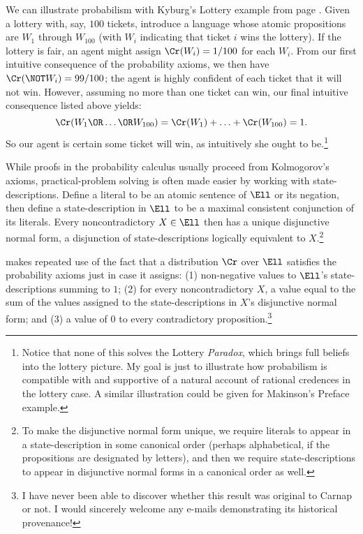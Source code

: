 We can illustrate probabilism with Kyburg's Lottery example from page \pageref{titelbaum-lottery}. Given a lottery with, say, $100$ tickets, introduce a language whose atomic propositions are $W_1$ through $W_{100}$ (with $W_i$ indicating that ticket $i$ wins the lottery). If the lottery is fair, an agent might assign $\Cr(W_i)=1/100$ for each $W_i$. From our first intuitive consequence of the probability axioms, we then have $\Cr(\NOT W_i)=99/100$; the agent is highly confident of each ticket that it will not win. However, assuming no more than one ticket can win, our final intuitive consequence listed above yields: 
\begin{equation}
\Cr(W_1 \OR \ldots \OR W_{100})= \Cr(W_1)+\ldots+\Cr(W_{100})=1.
\end{equation}
So our agent is certain some ticket will win, as intuitively she ought to be.\footnote
{Notice that none of this solves the Lottery \emph{Paradox}, which brings full beliefs into the lottery picture. My goal is just to illustrate how probabilism is compatible with and supportive of a natural account of rational credences in the lottery case. A similar illustration could be given for Makinson's Preface example.}

While proofs in the probability calculus usually proceed from Kolmogorov's axioms, practical-problem solving is often made easier by working with state-descriptions. Define a literal to be an atomic sentence of $\Ell$ or its negation, then define a state-description in $\Ell$ to be a maximal consistent conjunction of its literals. Every noncontradictory $X \in \Ell$ then has a unique disjunctive normal form, a disjunction of state-descriptions logically equivalent to $X$.\footnote
{To make the disjunctive normal form unique, we require literals to appear in a state-description in some canonical order (perhaps alphabetical, if the propositions are designated by letters), and then we require state-descriptions to appear in disjunctive normal forms in a canonical order as well.}

\citet{CarnapLogical} makes repeated use of the fact that a distribution $\Cr$ over $\Ell$ satisfies the probability axioms just in case it assigns: (1) non-negative values to $\Ell$'s state-descriptions summing to $1$; (2) for every noncontradictory $X$, a value equal to the sum of the values assigned to the state-descriptions in $X$'s disjunctive normal form; and (3) a value of $0$ to every contradictory proposition.\footnote
{I have never been able to discover whether this result was original to Carnap or not. I would sincerely welcome any e-mails demonstrating its historical provenance!}

